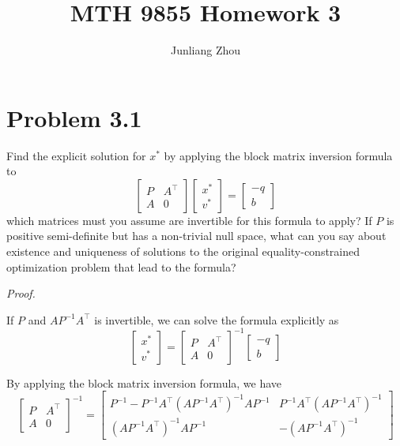 \documentclass[a4paper]{article}
\title{MTH 9855 Homework 3}
\author{Junliang Zhou}
\begin{document}
\maketitle

\section{Problem 3.1}

Find the explicit solution for $x^{*}$ by applying the block matrix inversion formula to
\[
\begin{bmatrix}
    P & A^\intercal \\
    A & 0
\end{bmatrix}
\begin{bmatrix}
    x^{*} \\
    v^{*}
\end{bmatrix}
=
\begin{bmatrix}
    -q \\
    b
\end{bmatrix}
\]
which matrices must you assume are invertible for this formula to apply? If $P$ is positive semi-definite but has a non-trivial null space, what can you say about existence and uniqueness of solutions to the original equality-constrained optimization problem that lead to the formula?\newline

\textit{Proof.}\newline

If $P$ and $A P^{-1} {A^\intercal}$ is invertible, we can solve the formula explicitly as
\[
\begin{bmatrix}
    x^{*} \\
    v^{*}
\end{bmatrix}
=
\begin{bmatrix}
    P & A^\intercal \\
    A & 0
\end{bmatrix}
^{-1}
\begin{bmatrix}
    -q \\
    b
\end{bmatrix}
\]

By applying the block matrix inversion formula, we have
\[
\begin{bmatrix}
    P & A^\intercal \\
    A & 0
\end{bmatrix}
^{-1}
=
\begin{bmatrix}
    P^{-1}-P^{-1} {A^\intercal} {(A P^{-1} {A^\intercal})^{-1}} A P^{-1} & P^{-1} {A^\intercal} {(A P^{-1} {A^\intercal})^{-1}} \\
    {(A P^{-1} {A^\intercal})^{-1}} A P^{-1} & -{(A P^{-1} {A^\intercal})^{-1}}
\end{bmatrix}
\]
\end{document}
